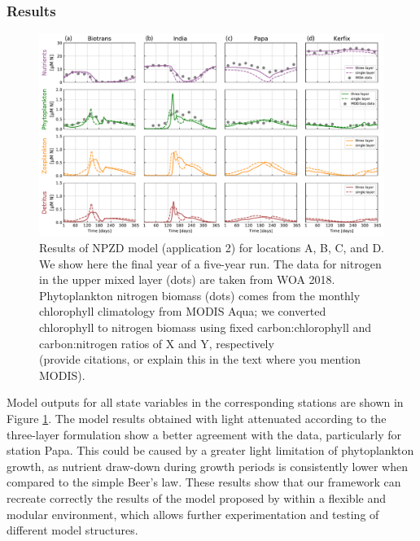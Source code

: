 \documentclass[journal abbreviation, manuscript]{copernicus}
\begin{document}
\subsubsection{Results}
\begin{figure}[t]
\includegraphics[width=15cm]{Figures/firstdraft_plots/02_EMPOWER_lightcomp.pdf}
\caption{Results of NPZD model (application 2) for locations A, B, C, and D. We show here the final year of a five-year run. The data for nitrogen in the upper mixed layer (dots) are taken from WOA 2018. Phytoplankton nitrogen biomass (dots) comes from the monthly chlorophyll climatology from MODIS Aqua; we converted chlorophyll to nitrogen biomass using fixed carbon:chlorophyll and carbon:nitrogen ratios of X and Y, respectively $$$$(provide citations, or explain this in the text where you mention MODIS).}
\label{Figure:ResultsEMPOWER}
\end{figure}


Model outputs for all state variables in the corresponding stations are shown in Figure \ref{Figure:ResultsEMPOWER}. The model results obtained with light attenuated according to the three-layer formulation show a better agreement with the data, particularly for station Papa. This could be caused by a greater light limitation of phytoplankton growth, as nutrient draw-down during growth periods is consistently lower when compared to the simple Beer's law. These results show that our framework can recreate correctly the results of the model proposed by \citet{Anderson2015c} within a flexible and modular environment, which allows further experimentation and testing of different model structures.
\end{document}
